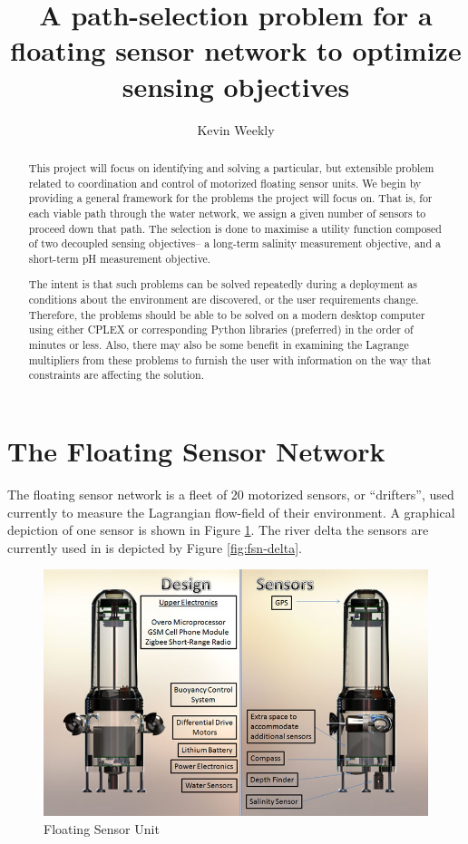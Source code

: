\documentclass[letter,10pt]{article}
\title{A path-selection problem for a floating sensor network to optimize sensing objectives}
\author{Kevin Weekly}
\begin{document}
\maketitle

\begin{abstract}
This project will focus on identifying and solving a particular, but extensible problem related to coordination and control of motorized floating sensor units. We begin by providing a general framework for the problems the project will focus on. That is, for each viable path through the water network, we assign a given number of sensors to proceed down that path.  The selection is done to maximise a utility function composed of two decoupled sensing objectives-- a long-term salinity measurement objective, and a short-term pH measurement objective.

The intent is that such problems can be solved repeatedly during a deployment as conditions about the environment are discovered, or the user requirements change.  Therefore, the problems should be able to be solved on a modern desktop computer using either CPLEX or corresponding Python libraries (preferred) in the order of minutes or less.  Also, there may also be some benefit in examining the Lagrange multipliers from these problems to furnish the user with information on the way that constraints are affecting the solution. 
\end{abstract}

\section{The Floating Sensor Network}

The floating sensor network is a fleet of 20 motorized sensors, or ``drifters'', used currently to measure the Lagrangian flow-field of their environment.  A graphical depiction of one sensor is shown in Figure \ref{fig:fsn-drifter}. The river delta the sensors are currently used in is depicted by Figure \ref{fig:fsn-delta}.

\begin{figure}[h]
 \centering
 \includegraphics[width=\linewidth ]{figures/fsn.jpg}
 \caption{Floating Sensor Unit\label{fig:fsn-drifter}}
\end{figure}
\end{document}
